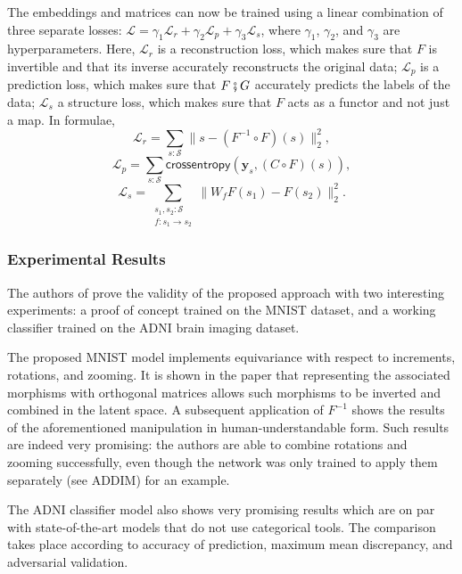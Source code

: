\documentclass[12pt,a4paper,openright,twoside]{report}
\theoremstyle{plain}
\theoremstyle{definition}
\begin{document}
The embeddings and matrices can now be trained using a linear combination of three separate losses: $\mathcal{L} = \gamma_1\mathcal{L}_r + \gamma_2\mathcal{L}_p + \gamma_3\mathcal{L}_s$, where $\gamma_1$, $\gamma_2$, and $\gamma_3$ are hyperparameters. Here, $\mathcal{L}_r$ is a reconstruction loss, which makes sure that $F$ is invertible and that its inverse accurately reconstructs the original data; $\mathcal{L}_p$ is a prediction loss, which makes sure that $F \fatsemi G$ accurately predicts the labels of the data; $\mathcal{L}_s$ a structure loss, which makes sure that $F$ acts as a functor and not just a map. In formulae,
\[\mathcal{L}_r = \sum_{s : \mathcal{S}}\|s-(F^{-1} \circ F)(s)\|^2_2,\]
\[\mathcal{L}_p = \sum_{s : \mathcal{S}}\mathsf{crossentropy}(\mathbf{y}_s,(C \circ F)(s)),\]
\[\mathcal{L}_s = \sum_{\begin{smallmatrix}s_1, s_2 : \mathcal{S} \\ f: s_1 \to s_2 \end{smallmatrix}}\|W_fF(s_1)-F(s_2)\|^2_2.\]

\subsubsection{Experimental Results}

The authors of \cite{chytas2024poolingimagedatasetsmultiple} prove the validity of the proposed approach with two interesting experiments: a proof of concept trained on the MNIST dataset, and a working classifier trained on the ADNI brain imaging dataset.

The proposed MNIST model implements equivariance with respect to increments, rotations, and zooming. It is shown in the paper that representing the associated morphisms with orthogonal matrices allows such morphisms to be inverted and combined in the latent space. A subsequent application of $F^{-1}$ shows the results of the aforementioned manipulation in human-understandable form. Such results are indeed very promising: the authors are able to combine rotations and zooming successfully, even though the network was only trained to apply them separately (see ADDIM) for an example.


The ADNI classifier model also shows very promising results which are on par with state-of-the-art models that do not use categorical tools. The comparison takes place according to accuracy of prediction, maximum mean discrepancy, and adversarial validation.
\end{document}

